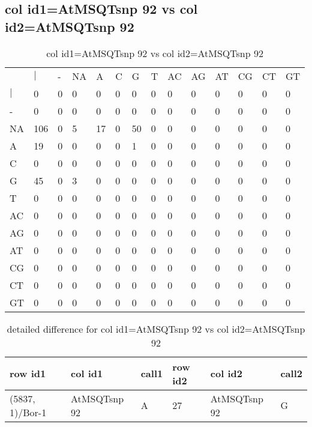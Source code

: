 \subsection{col id1=AtMSQTsnp 92 vs col id2=AtMSQTsnp 92}
\begin{center}
\begin{longtable}{|l|l|l|l|l|l|l|l|l|l|l|l|l|l|}
\caption{col id1=AtMSQTsnp 92 vs col id2=AtMSQTsnp 92} \label{table_dm788}\\
\hline
\\
\hline
&$|$&-&NA&A&C&G&T&AC&AG&AT&CG&CT&GT\\
$|$&0&0&0&0&0&0&0&0&0&0&0&0&0\\
-&0&0&0&0&0&0&0&0&0&0&0&0&0\\
NA&106&0&5&17&0&50&0&0&0&0&0&0&0\\
A&19&0&0&0&0&1&0&0&0&0&0&0&0\\
C&0&0&0&0&0&0&0&0&0&0&0&0&0\\
G&45&0&3&0&0&0&0&0&0&0&0&0&0\\
T&0&0&0&0&0&0&0&0&0&0&0&0&0\\
AC&0&0&0&0&0&0&0&0&0&0&0&0&0\\
AG&0&0&0&0&0&0&0&0&0&0&0&0&0\\
AT&0&0&0&0&0&0&0&0&0&0&0&0&0\\
CG&0&0&0&0&0&0&0&0&0&0&0&0&0\\
CT&0&0&0&0&0&0&0&0&0&0&0&0&0\\
GT&0&0&0&0&0&0&0&0&0&0&0&0&0\\
\hline
\end{longtable}
\end{center}

\begin{center}
\begin{longtable}{|l|l|l|l|l|l|}
\caption{detailed difference for col id1=AtMSQTsnp 92 vs col id2=AtMSQTsnp 92} \label{table_dm789}\\
\hline
row id1&col id1&call1&row id2&col id2&call2\\
\hline
(5837, 1)/Bor-1&AtMSQTsnp 92&A&27&AtMSQTsnp 92&G\\
\hline
\end{longtable}
\end{center}

